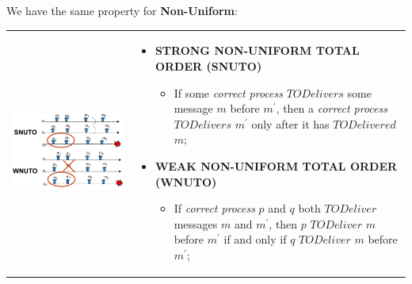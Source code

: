 \documentclass{article}
\begin{document}
We have the same property for \textbf{Non-Uniform}:\\
\begin{tabular}{C{5cm}  L{10.5cm}}
        \includegraphics[scale=1]{cattura58.png} &
\begin{itemize}
\item \textbf{STRONG NON-UNIFORM TOTAL ORDER (SNUTO)}
\begin{itemize}
\item If some \emph{correct process} $TODelivers$ some message $m$ before $m^{'}$, then a \emph{correct process} $TODelivers$ $m^{'}$ only after it has $TODelivered$ $m$;
\end{itemize}
\item \textbf{WEAK NON-UNIFORM TOTAL ORDER (WNUTO)}
\begin{itemize}
\item If \emph{correct process} $p$ and $q$ both $TODeliver$ messages $m$ and $m^{'}$, then $p$ $TODeliver$ $m$ before $m^{'}$ if and only if $q$ $TODeliver$ $m$ before $m^{'}$;
\end{itemize}
\end{itemize}
\end{tabular}
\end{document}
